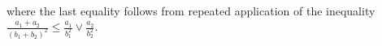 \documentclass{article}
\newcommand{\mc}[1]{\mathcal{#1}}
\newcommand{\1}{\mathbf{1}}
\renewcommand{\v}{r} %
\begin{document}
\begin{align*}
\end{align*}
where the last equality follows from repeated application of the inequality $\frac{a_1 + a_2}{(b_1+b_2)^2} \leq \frac{a_1}{b_1^2} \vee \frac{a_2}{b_2^2}$.
\end{document}

